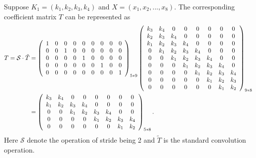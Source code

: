 Suppose $K_1=(k_1, k_2, k_3, k_4)$ and $X=(x_1, x_2, ..., x_8)$. The corresponding coefficient matrix $T$ can be represented as 
\begin{align}
   T = \mathcal S \cdot \tilde{T} &= 
\left(
  \begin{array}{ccccccccc}
     1 & 0 & 0 & 0 & 0 & 0 & 0 & 0 & 0 \\
     0 & 0 & 1 & 0 & 0 & 0 & 0 & 0 & 0 \\
     0 & 0 & 0 & 0 & 1 & 0 & 0 & 0 & 0 \\
     0 & 0 & 0 & 0 & 0 & 0 & 1 & 0 & 0 \\
     0 & 0 & 0 & 0 & 0 & 0 & 0 & 0 & 1 \\
  \end{array}
\right)_{5*9}
\left(
  \begin{array}{cccccccc}
     k_3 & k_4 & 0 & 0 & 0 & 0 & 0 & 0  \\
     k_2 & k_3 & k_4 & 0 & 0 & 0 & 0 &  0 \\
     k_1 & k_2 & k_3 & k_4 & 0 & 0 & 0 & 0  \\
     0 & k_1 & k_2 & k_3 & k_4 & 0 & 0 & 0  \\
     0 & 0 & k_1 & k_2 & k_3 & k_4 & 0 & 0  \\
     0 & 0 & 0 & k_1 & k_2 & k_3 & k_4 & 0  \\
     0 & 0 & 0 & 0 & k_1 & k_2 & k_3 & k_4  \\
     0 & 0 & 0 & 0 & 0 & k_1 & k_2 & k_3   \\
     0 & 0 & 0 & 0 & 0 & 0 & k_1 & k_2  \\
  \end{array}
\right)_{9*8}\\ \notag 
&= 
\left(
  \begin{array}{cccccccc}
     k_3 & k_4 & 0 & 0 & 0 & 0 & 0 & 0  \\
     k_1 & k_2 & k_3 & k_4 & 0 & 0 & 0 &  0 \\
     0 & 0 & k_1 & k_2 & k_3 & k_4 & 0 &  0  \\
     0 & 0 & 0 &0 & k_1 & k_2 & k_3 & k_4   \\
     0 & 0 & 0 & 0 & 0 & 0 & k_1 & k_2    \\
  \end{array}
\right)_{5*8}.
\end{align}
Here $\mathcal S$ denote the operation of stride being 2 and $\tilde{T}$ is the standard convolution operation.

